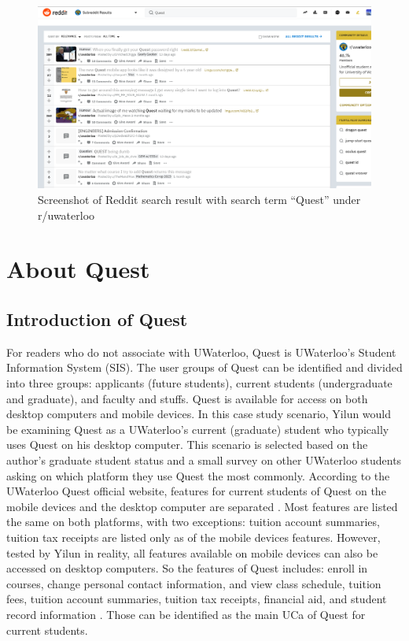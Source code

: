 \documentclass[conference]{IEEEtran}
\begin{document}
\begin{figure}[htdp]
\centering
  \includegraphics[width=1\columnwidth]{Reddit.png}
  \caption{Screenshot of Reddit search result with search term ``Quest'' under r/uwaterloo}
  \label{fig:figure1}
\end{figure}

\section{About Quest} \label{about quest}
\subsection{Introduction of Quest}
For readers who do not associate with UWaterloo, Quest is UWaterloo's Student Information System (SIS). The user groups of Quest can be identified and divided into three groups: applicants (future students), current students (undergraduate and graduate), and faculty and stuffs. Quest is available for access on both desktop computers and mobile devices. In this case study scenario, Yilun would be examining Quest as a UWaterloo's current (graduate) student who typically uses Quest on his desktop computer. This scenario is selected based on the author's graduate student status and a small survey on other UWaterloo students asking on which platform they use Quest the most commonly. According to the UWaterloo Quest official website, features for current students of Quest on the mobile devices and the desktop computer are separated \cite{b1}. Most features are listed the same on both platforms, with two exceptions: tuition account summaries, tuition tax receipts are listed only as of the mobile devices features. However, tested by Yilun in reality, all features available on mobile devices can also be accessed on desktop computers. So the features of Quest includes: enroll in courses, change personal contact information, and view class schedule, tuition fees, tuition account summaries, tuition tax receipts, financial aid, and student record information \cite{b1}. Those can be identified as the main UCa of Quest for current students. 
\end{document}
